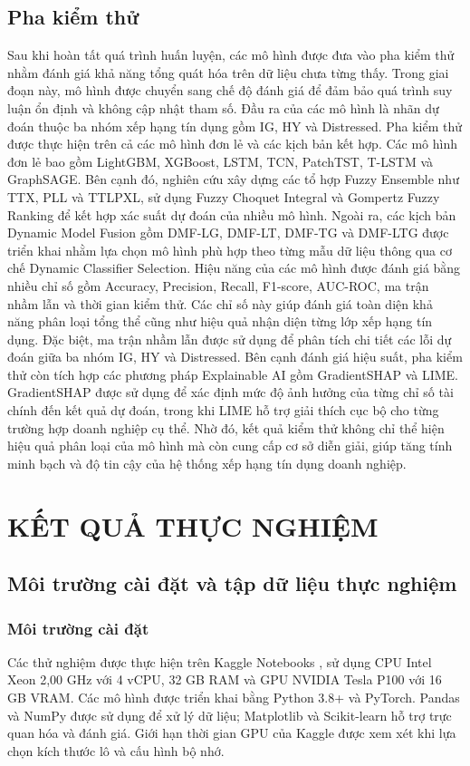 \documentclass[10pt,twoside]{article}
\begin{document}
\subsection{Pha kiểm thử}
Sau khi hoàn tất quá trình huấn luyện, các mô hình được đưa vào pha kiểm thử nhằm đánh giá khả năng tổng quát hóa trên dữ liệu chưa từng thấy. Trong giai đoạn này, mô hình được chuyển sang chế độ đánh giá để đảm bảo quá trình suy luận ổn định và không cập nhật tham số. Đầu ra của các mô hình là nhãn dự đoán thuộc ba nhóm xếp hạng tín dụng gồm IG, HY và Distressed. Pha kiểm thử được thực hiện trên cả các mô hình đơn lẻ và các kịch bản kết hợp. Các mô hình đơn lẻ bao gồm LightGBM, XGBoost, LSTM, TCN, PatchTST, T-LSTM và GraphSAGE. Bên cạnh đó, nghiên cứu xây dựng các tổ hợp Fuzzy Ensemble như TTX, PLL và TTLPXL, sử dụng Fuzzy Choquet Integral và Gompertz Fuzzy Ranking để kết hợp xác suất dự đoán của nhiều mô hình. Ngoài ra, các kịch bản Dynamic Model Fusion gồm DMF-LG, DMF-LT, DMF-TG và DMF-LTG được triển khai nhằm lựa chọn mô hình phù hợp theo từng mẫu dữ liệu thông qua cơ chế Dynamic Classifier Selection. Hiệu năng của các mô hình được đánh giá bằng nhiều chỉ số gồm Accuracy, Precision, Recall, F1-score, AUC-ROC, ma trận nhầm lẫn và thời gian kiểm thử. Các chỉ số này giúp đánh giá toàn diện khả năng phân loại tổng thể cũng như hiệu quả nhận diện từng lớp xếp hạng tín dụng. Đặc biệt, ma trận nhầm lẫn được sử dụng để phân tích chi tiết các lỗi dự đoán giữa ba nhóm IG, HY và Distressed. Bên cạnh đánh giá hiệu suất, pha kiểm thử còn tích hợp các phương pháp Explainable AI gồm GradientSHAP và LIME. GradientSHAP được sử dụng để xác định mức độ ảnh hưởng của từng chỉ số tài chính đến kết quả dự đoán, trong khi LIME hỗ trợ giải thích cục bộ cho từng trường hợp doanh nghiệp cụ thể. Nhờ đó, kết quả kiểm thử không chỉ thể hiện hiệu quả phân loại của mô hình mà còn cung cấp cơ sở diễn giải, giúp tăng tính minh bạch và độ tin cậy của hệ thống xếp hạng tín dụng doanh nghiệp.


\section{KẾT QUẢ THỰC NGHIỆM}

\subsection{Môi trường cài đặt và tập dữ liệu thực nghiệm}

\subsubsection{Môi trường cài đặt}
Các thử nghiệm được thực hiện trên Kaggle Notebooks \cite{noauthor_notebooks_nodate}, sử dụng CPU Intel Xeon 2,00 GHz với 4 vCPU, 32 GB RAM và GPU NVIDIA Tesla P100 với 16 GB VRAM. Các mô hình được triển khai bằng Python 3.8+ và PyTorch. Pandas và NumPy được sử dụng để xử lý dữ liệu; Matplotlib và Scikit-learn hỗ trợ trực quan hóa và đánh giá. Giới hạn thời gian GPU của Kaggle được xem xét khi lựa chọn kích thước lô và cấu hình bộ nhớ.
\end{document}
